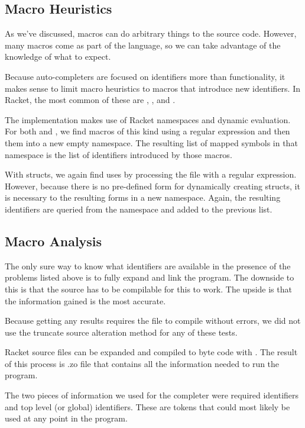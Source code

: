 \documentclass[ms,electronic,twosidetoc,letterpaper,chaptercenter,parttop,lol,lof,lot]{byumsphd}
\begin{document}
\subsection{Macro Heuristics}

As we've discussed, macros can do arbitrary things to the source code.
However, many macros come as part of the language, so we can take advantage of the knowledge of what to expect.

Because auto-completers are focused on identifiers more than functionality, it makes sense to limit macro heuristics to macros that introduce new identifiers.
In Racket, the most common of these are , , and .

The implementation makes use of Racket namespaces and dynamic evaluation.
For both  and , we find macros of this kind using a regular expression and then  them into a new empty namespace.
The resulting list of mapped symbols in that namespace is the list of identifiers introduced by those macros.

With structs, we again find uses by processing the file with a regular expression.
However, because there is no pre-defined form for dynamically creating structs, it is necessary to  the resulting forms in a new namespace.
Again, the resulting identifiers are queried from the namespace and added to the previous list.

\subsection{Macro Analysis}

The only sure way to know what identifiers are available in the presence of the problems listed above is to fully expand and link the program.
The downside to this is that the source has to be compilable for this to work.
The upside is that the information gained is the most accurate.

Because getting any results requires the file to compile without errors, we did not use the truncate source alteration method for any of these tests.

Racket source files can be expanded and compiled to byte code with .
The result of this process is .zo file that contains all the information needed to run the program.

The two pieces of information we used for the completer were required identifiers and top level (or global) identifiers.
These are tokens that could most likely be used at any point in the program.
\end{document}
